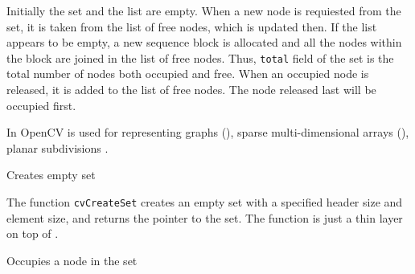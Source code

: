 Initially the set and the list are empty. When a new node is requiested
from the set, it is taken from the list of free nodes, which is updated
then. If the list appears to be empty, a new sequence block is allocated
and all the nodes within the block are joined in the list of free
nodes. Thus, \texttt{total} field of the set is the total number of nodes
both occupied and free. When an occupied node is released, it is added
to the list of free nodes. The node released last will be occupied first.

In OpenCV  is used for representing graphs (),
sparse multi-dimensional arrays (), planar subdivisions
.

\label{CreateSet}

Creates empty set


\begin{description}
\end{description}

The function \texttt{cvCreateSet} creates an empty set with a specified header size and element size, and returns the pointer to the set. The function is just a thin layer on top of .

\label{SetAdd}

Occupies a node in the set


\begin{description}
\end{description}

